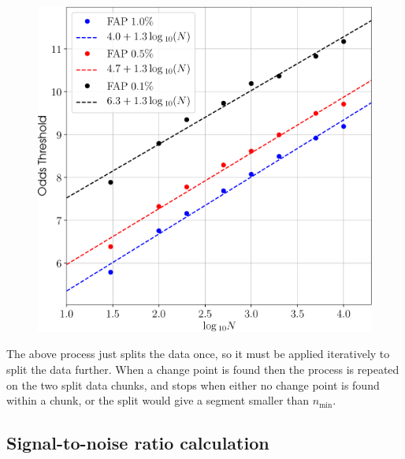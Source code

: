 \begin{figure}[!phtb]
\begin{center}
\includegraphics[width=1\columnwidth]{./figures/changepoint/changepoint}
\caption{ \protect}
\end{center}
\end{figure}

The above process just splits the data once, so it must be applied iteratively to split the data further. When a change point is
found then the process is repeated on the two split data chunks, and stops when either no change point is found within a chunk,
or the split would give a segment smaller than $n_{\text{min}}$.

\subsection{Signal-to-noise ratio calculation}\label{sec:snr}

